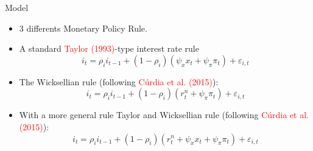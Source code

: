 \documentclass[9pt]{beamer}
\begin{document}
\begin{frame}{Model}
\begin{itemize}
\item 3 differents Monetary Policy Rule.

\item A standard \textcolor{red}{Taylor (1993)}-type interest rate rule
\begin{equation*}
    i_t = \rho_i i_{t-1} + (1 - \rho_i)(\psi_{x}x_t + \psi_{\pi} \pi_t) + \varepsilon_{i,t}
\end{equation*}

\item The Wicksellian rule  (following \textcolor{red}{Cúrdia et al. (2015)}):
\begin{equation*}
    i_t = \rho_i i_{t-1} + (1 - \rho_i)(r_t^{n} + \psi_{\pi} \pi_t) + \varepsilon_{i,t}
\end{equation*}

\item With a more general rule Taylor and Wicksellian rule  (following \textcolor{red}{Cúrdia et al. (2015)}):
\begin{equation*}
    i_t = \rho_i i_{t-1} + (1 - \rho_i)(r_t^{n} + \psi_{x}x_t + \psi_{\pi} \pi_t) + \varepsilon_{i,t}
\end{equation*}


\end{itemize}
\end{frame}
\end{document}
